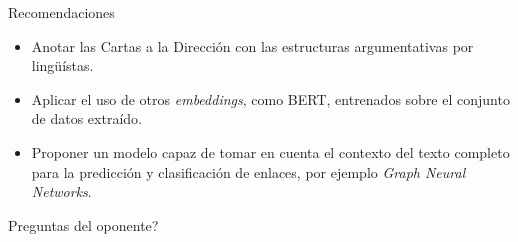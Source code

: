 \documentclass{beamer}
\begin{document}
\begin{frame}{Recomendaciones}
    \begin{itemize}
        \item<1-> Anotar las Cartas a la Dirección con las estructuras argumentativas por lingüístas.
        \item<2-> Aplicar el uso de otros \textit{embeddings}, como BERT, entrenados sobre el conjunto 
        de datos extraído.
        \item<3-> Proponer un modelo capaz de tomar en cuenta el contexto del texto completo para la
        predicción y clasificación de enlaces, por ejemplo \textit{Graph Neural Networks}.
    \end{itemize}    
\end{frame}

\begin{frame}
    \titlepage 
\end{frame}

\begin{frame}{Preguntas del oponente?}
    
\end{frame}
\end{document}

